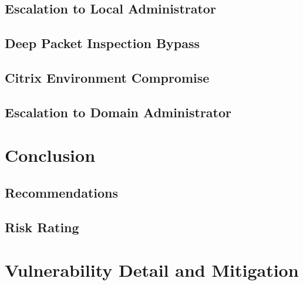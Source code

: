 \documentclass[a4paper]{article}
\begin{document}
        \subsection{Escalation to Local Administrator}
        \subsection{Deep Packet Inspection Bypass}
        \subsection{Citrix Environment Compromise }
        \subsection{Escalation to Domain Administrator}

    \section{Conclusion}
            \subsection{Recommendations}
            \subsection{Risk Rating}
    \section{Vulnerability Detail and Mitigation}
\end{document}
